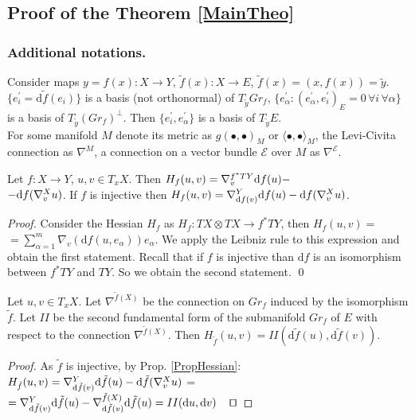 \documentclass{llncs}
\newcommand{\CovariantDiffManif}[1]{\nabla^{#1}}
\newcommand{\CovariantDerivManif}[2]{\tensor*{\nabla}{^{#1}_{#2}}}
\newcommand{\CovariantDeriv}[1]{\nabla_{#1}}
\newcommand{\Diff}{\mathrm{d}}
\newcommand{\TangentBundle}[1]{T{#1}}
\newcommand {\Preimage}[2]{{#2}^*{#1}}
\newcommand \TPreimage[2]{\Preimage{\TangentBundle{#1}}{#2}}
\newcommand {\bigeps}{\mathcal{E}}
\begin{document}
\subsection{Proof of the Theorem \ref{MainTheo}}
\subsubsection{Additional notations.}
Consider maps $y = f(x):X\to Y$, $\tilde{f}(x):X \to E$, $\tilde{f}(x)=(x,f(x))=\tilde{y}$. $\{e_i^{'}=\Diff \tilde{f}(e_i)\}$ is a basis (not orthonormal) of $T_{\tilde{y}} Gr_f$, 
$\{e_\alpha^{'}: (e_\alpha^{'},e_i^{'})_{E} = 0 \,\forall i \, \forall \alpha \}$ is a basis of $T_{\tilde{y}} (Gr_f)^{\bot}$. Then $\{e_i^{'}, e_\alpha^{'}\}$ is a basis of $T_{\tilde{y}} E$.
\\
For some manifold $M$ denote its metric as $g(∙,∙)_{M}$ or $\langle∙,∙\rangle_{M}$, the Levi-Civita connection as $\CovariantDiffManif{M}$, a connection on a vector bundle $\bigeps$ over $M$ as $\CovariantDiffManif{\bigeps}$. 

\begin{proposition} \label{PropHessian}
Let $f:X\to Y$, $u, v\in T_x X$. Then
$H_f(u,v)=\CovariantDerivManif{\TPreimage{Y}{f}} {v} \Diff f(u) -$
\\
							$-\Diff f( 
							\CovariantDerivManif{X}{v}u
							)$.
							If $f$ is injective then 
							$H_f(u,v)=\CovariantDerivManif{Y}{ \Diff f(v)} \Diff f(u) - 
							\Diff f( 
							\CovariantDerivManif{X}{v}u
							)$.
\end{proposition}

\begin{proof}
Consider the Hessian $H_f$ as $H_f:\TangentBundle{X}\otimes\TangentBundle{X}\to \TPreimage{Y}{f}$, 
then $H_f(u, v)=$
\\
$= \sum_{\alpha=1}^m \CovariantDeriv{v}{(\Diff f(u, e_{\alpha}))} e_{\alpha}$. 
We apply the Leibniz rule to this expression and obtain the first statement. 
Recall that if $f$ is injective than $\Diff f$ is an isomorphism between $\TPreimage{Y}{f}$ and $TY$. So we obtain the second statement.
\qed
\end{proof}

\begin{lemma}  \label{LemSecondFormHessian}
Let $u, v \in T_xX$. Let $\CovariantDiffManif{\tilde{f}(X)}$ be the connection on $Gr_f$ induced by the isomorphism $\tilde{f}$. Let $II$ be the second fundamental form of the submanifold $Gr_f$ of $E$ with respect to the connection $\CovariantDiffManif{\tilde{f}(X)}$. Then 
$H_{\tilde{f}}(u, v) = II(\Diff \tilde{f}(u), \Diff \tilde{f}(v))$.
\end{lemma}
\begin{proof}
As $\tilde{f}$ is injective, by Prop. \ref{PropHessian}:
$H_{\tilde{f}}(u, v) = 
						\CovariantDerivManif{Y} {\Diff \tilde{f}(v)} \Diff \tilde{f}(u) - 
							\Diff \tilde{f}(\CovariantDerivManif{X}{v}u )$ = 
							\\
							$=\CovariantDerivManif{Y} {\Diff \tilde{f}(v)} \Diff \tilde{f}(u) - 
							\CovariantDerivManif{\tilde{f}(X)}{\Diff \tilde{f}(v)}\Diff \tilde{f}(u) = II(\Diff u, \Diff v)\,\textrm{\qed}$
\end{proof}
\end{document}
